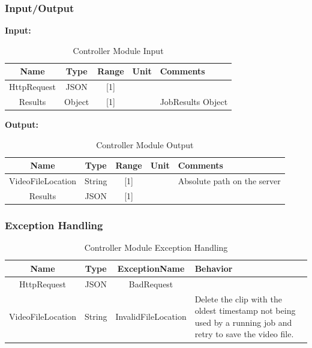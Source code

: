 \documentclass{article}
\begin{document}
\subsubsection{Input/Output}
\textbf{Input:}
\begin{table}[H]
    \caption{Controller Module Input}
    \centering
    \begin{tabularx}{0.7\textwidth}{|c|c|c|c|X|} \hline
        \textbf{Name} & \textbf{Type} & \textbf{Range} & \textbf{Unit} & \textbf{Comments} \\ \hline
        HttpRequest & JSON & [1] & & \\ \hline
        Results & Object & [1] & & JobResults Object \\ \hline
    \end{tabularx}
    \label{tab:Controller_Input}
\end{table}

\textbf{Output:}
\begin{table}[H]
    \caption{Controller Module Output}
    \centering
    \begin{tabularx}{0.7\textwidth}{|c|c|c|c|X|} \hline
        \textbf{Name} & \textbf{Type} & \textbf{Range} & \textbf{Unit} & \textbf{Comments} \\ \hline
        VideoFileLocation & String & [1] & & Absolute path on the server \\ \hline
        Results & JSON & [1] & & \\ \hline
    \end{tabularx}
    \label{tab:Controller_Output}
\end{table}

\subsubsection{Exception Handling}
\begin{table}[H]
    \caption{Controller Module Exception Handling}
    \centering
    \begin{tabularx}{0.7\textwidth}{|c|c|c|X|} \hline
        \textbf{Name} & \textbf{Type} & \textbf{ExceptionName} & \textbf{Behavior} \\ \hline
        HttpRequest & JSON & BadRequest & \\ \hline
        VideoFileLocation & String & InvalidFileLocation & Delete the clip with the oldest timestamp not being used by a running job and retry to save the video file. \\ \hline
    \end{tabularx}
    \label{tab:Controller_Exception}
\end{table}
\end{document}
